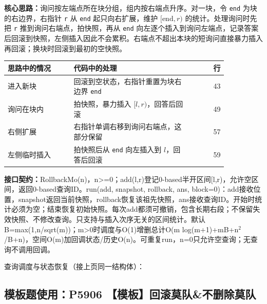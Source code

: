 \textbf{核心思路：}\allowbreak 询问按左端点所在块分组，组内按右端点升序。对一块，令 \texttt{end} 为块的右边界，右指针 \texttt{r} 从 \texttt{end} 起只向右扩展，维护 $[\mathrm{end},r)$ 的统计。处理询问时先把 \texttt{r} 推到询问右端点，拍快照，再从 \texttt{end} 向左逐个插入到询问左端点，记录答案后回滚到快照，左侧插入因此不会累积。右端点不超出本块的短询问直接暴力插入再回滚；换块时回滚到最初的空快照。

\begin{center}\small
\begin{tabular}{@{}p{0.30\linewidth}p{0.55\linewidth}r@{}}
\toprule
思路中的情况 & 代码中的处理 & 行\\
\midrule
进入新块 & 回滚到空状态，右指针重置为块右边界 \texttt{end} & 43\\
询问在块内 & 拍快照，暴力插入 $[l,r)$，回答后回滚 & 49\\
右侧扩展 & 右指针单调右移到询问右端点，这部分保留 & 57\\
左侧临时插入 & 拍快照后从 \texttt{end} 向左插入到 $l$，回答后回滚 & 59\\
\bottomrule
\end{tabular}
\end{center}



{\sloppy{}\noindent\textbf{接口契约：}RollbackMo(n)，n>=0；add(l,r)登记0-based半开区间[l,r)，允许空区间，返回0-based查询ID。run(add, snapshot, rollback, ans, block=0)：add接收位置，snapshot返回当前快照，rollback恢复该祖先快照，ans接收查询ID。开始时统计必须为空；结束恢复初始快照。每次add都须可撤销，包含长期右段；不保留失效快照、不修改查询。只支持与插入次序无关的区间统计。默认B=max(1,n/sqrt(m))；m>0时调度与O(1)增删总计O(m log(m+1)+mB+n$^{2}$/B+n)，空间O(m)加回调状态/历史O(n)。可重复run，n=0只允许空查询；无查询不调用回调。\par}



\newpage

\noindent 查询调度与状态恢复（接上页同一结构体）：



\Needspace{431pt}

\subsection*{模板题使用：P5906 【模板】回滚莫队\&不删除莫队}

